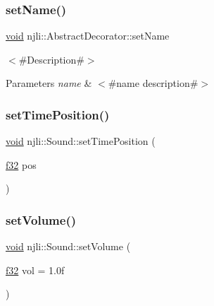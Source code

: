 \subsubsection{\texorpdfstring{set\+Name()}{setName()}}
{\footnotesize\ttfamily \mbox{\hyperlink{_thread_8h_af1e856da2e658414cb2456cb6f7ebc66}{void}} njli\+::\+Abstract\+Decorator\+::set\+Name}

$<$\#\+Description\#$>$


\begin{DoxyParams}{Parameters}
{\em name} & $<$\#name description\#$>$ \\
\hline
\end{DoxyParams}
\mbox{\label{classnjli_1_1_sound_ab47ad411b9f9cc12b39ddd20080293e1}} 
\subsubsection{\texorpdfstring{set\+Time\+Position()}{setTimePosition()}}
{\footnotesize\ttfamily \mbox{\hyperlink{_thread_8h_af1e856da2e658414cb2456cb6f7ebc66}{void}} njli\+::\+Sound\+::set\+Time\+Position (\begin{DoxyParamCaption}\item[{\mbox{\hyperlink{_util_8h_a5f6906312a689f27d70e9d086649d3fd}{f32}}}]{pos }\end{DoxyParamCaption})}

\mbox{\label{classnjli_1_1_sound_a2dd1ddc8d8b04c90bb06808ad43e6642}} 
\subsubsection{\texorpdfstring{set\+Volume()}{setVolume()}}
{\footnotesize\ttfamily \mbox{\hyperlink{_thread_8h_af1e856da2e658414cb2456cb6f7ebc66}{void}} njli\+::\+Sound\+::set\+Volume (\begin{DoxyParamCaption}\item[{\mbox{\hyperlink{_util_8h_a5f6906312a689f27d70e9d086649d3fd}{f32}}}]{vol = {\ttfamily 1.0f} }\end{DoxyParamCaption})}

\mbox{\label{classnjli_1_1_sound_ab1bcced722c234e1f1e243ef2c0fec33}} 
